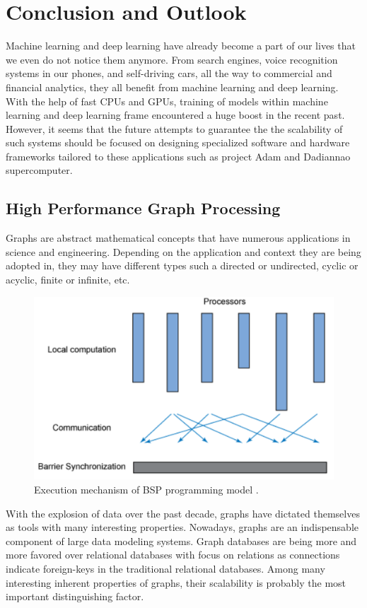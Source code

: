 \documentclass[runningheads,a4paper]{llncs}
\begin{document}
{\section*{Conclusion and Outlook}
Machine learning and deep learning  have already become a part of our lives that we even do not notice them anymore. From search engines, voice recognition systems in our phones, and self-driving cars, all the way to commercial and financial analytics, they all benefit from machine learning and deep learning. With the help of fast CPUs and GPUs, training of models within machine learning and deep learning frame encountered a huge boost in the recent past. However, it seems that the future attempts to guarantee the the scalability of such systems should be focused on designing specialized software and hardware frameworks tailored to these applications such as project Adam and Dadiannao supercomputer.\\
\subsection{High Performance Graph Processing}
Graphs are abstract mathematical concepts that have numerous applications in science and engineering. Depending on the application and context they are being adopted in, they may have different types such a directed or undirected, cyclic or acyclic, finite or infinite, etc.\\
\begin{figure}[!ht]
	\includegraphics[scale=0.38]{./images/BSP_model.png}
	\centering
	\caption{Execution mechanism of BSP programming model \cite{sakr2013processing}.}
	\label{fig:BSP}
\end{figure}
With the explosion of data over the past decade, graphs have dictated themselves as tools with many interesting properties. Nowadays, graphs are an indispensable component of large data modeling systems. Graph databases are being more and more favored over relational databases with focus on relations as connections indicate foreign-keys in the traditional relational databases. Among many interesting inherent properties of graphs, their scalability is probably the most important distinguishing factor.\\

}
\end{document}
